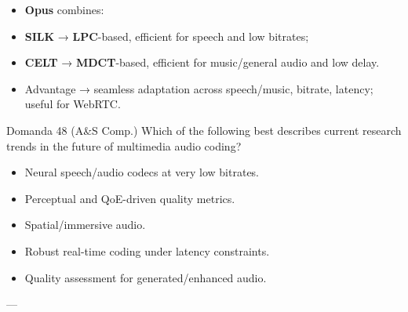 \begin{itemize}
  \item \textbf{Opus} combines:
  \item \textbf{SILK} → \textbf{LPC}-based, efficient for speech and low bitrates;
  \item \textbf{CELT} → \textbf{MDCT}-based, efficient for music/general audio and low delay.
  \item Advantage → seamless adaptation across speech/music, bitrate, latency; useful for WebRTC.
\end{itemize}



\begin{questionbox}{Domanda 48}
(A\&S Comp.) Which of the following best describes current research trends in the future of multimedia audio coding?
\end{questionbox}


\begin{itemize}
  \item Neural speech/audio codecs at very low bitrates.
  \item Perceptual and QoE-driven quality metrics.
  \item Spatial/immersive audio.
  \item Robust real-time coding under latency constraints.
  \item Quality assessment for generated/enhanced audio.
\end{itemize}

---


